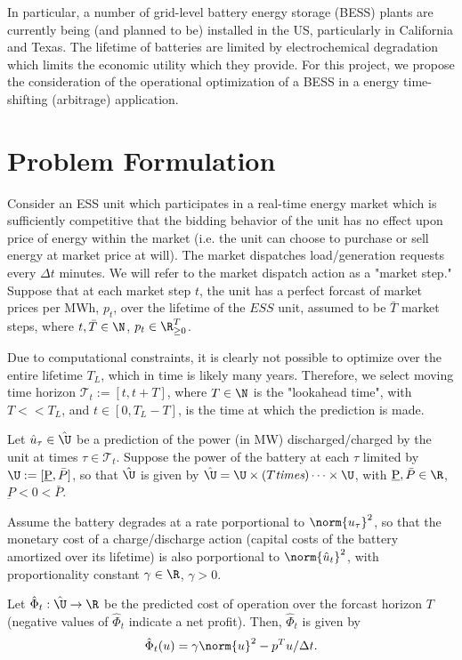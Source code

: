 \documentclass{homework}
\begin{document}
In particular, a number of grid-level battery energy storage (BESS) plants are
currently being (and planned to be) installed in the US, particularly in California and Texas.
The lifetime of batteries are limited by electrochemical degradation which limits
the economic utility which they provide.
For this project, we propose the consideration of the operational optimization of a BESS
in a energy time-shifting (arbitrage) application.

\section{Problem Formulation}

Consider an ESS unit which participates in a real-time energy market which is sufficiently
competitive that the bidding behavior of the unit has no effect upon price of energy
within the market (i.e. the unit can choose to purchase or sell energy at market price at will).
The market dispatches load/generation requests every $\Delta t$ minutes. We will
refer to the market dispatch action as a "market step." Suppose that at each market step $t$,
the unit has a perfect forcast of market prices per MWh, $p_t$, over the lifetime of the
$ESS$ unit, assumed to be $\bar{T}$ market steps, where $t,\bar{T}\in\N$, $p_t\in\R_{\geq0}^T$.

Due to computational constraints, it is clearly not possible to optimize over the
entire lifetime $T_L$, which in time is likely many years. Therefore, we select moving
time horizon $\mathcal{T}_t := [t, t + T]$, where $T\in\N$ is the "lookahead time", with $T<<T_L$,
and $t\in[0, T_L - T]$, is the time at which the prediction is made.

Let $\hat{u}_\tau\in\hat{\U}$ be a prediction of the power (in MW) discharged/charged by the unit
at times $\tau\in\mathcal{T}_t$. Suppose the power of the battery at each $\tau$
limited by $\U:=[\underbar{P}, \bar{P}]$,
so that $\hat{\U}$ is given by $\hat{\U} = \U \times (T \text{\it times}) \dots \times \U$, with
$\underbar{P}, \bar{P} \in \R$, $\underbar{P} < 0 < \bar{P}$.

Assume the battery degrades at a rate porportional to $\norm{u_\tau}^2$, so that
the monetary cost of a charge/discharge action (capital costs of the battery amortized over its
lifetime) is also porportional to $\norm{\hat{u}_t}^2$, with proportionality
constant $\gamma\in\R$, $\gamma>0$.

Let $\hat{\Phi}_t: \hat{\U} \to \R$ be the predicted cost of operation over the forcast horizon $T$
(negative values of $\hat{\Phi}_t$ indicate a net profit). Then, $\hat{\Phi}_t$ is given by
\begin{equation*}
    \hat{\Phi}_t(u) = \gamma \norm{u}^2 - p^T u / \Delta t.
\end{equation*}
\end{document}
